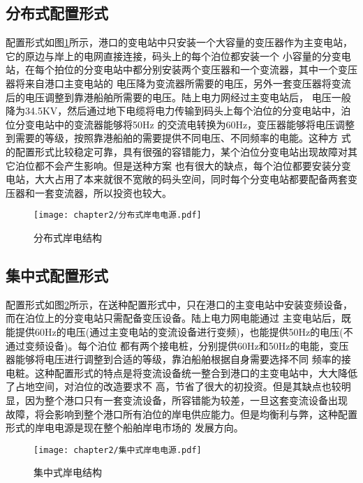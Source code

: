 \subsection{分布式配置形式}

配置形式如图\ref{fig:分布式岸电结构}所示，港口的变电站中只安装一个大容量的变压器作为主变电站，它的原边与岸上的电网直接连接，码头上的每个泊位都安装一个
小容量的分变电站，在每个拍位的分变电站中都分别安装两个变压器和一个变流器，其中一个变压器将来自港口主变电站的
电压降为变流器所需要的电压，另外一套变压器将变流后的电压调整到靠港船舶所需要的电压。陆上电力网经过主变电站后，
电压一般降为34.5KV，然后通过地下电缆将电力传输到码头上每个泊位的分变电站中，泊位分变电站中的变流器能够将50Hz
的交流电转换为60Hz，变压器能够将电压调整到需要的等级，按照靠港船舶的需要提供不同电压、不同频率的电能。这种方
式的配置形式比较稳定可靠，具有很强的容错能力，某个泊位分变电站出现故障对其它泊位都不会产生影响。但是送种方案
也有很大的缺点，每个泊位都要安装分变电站，大大占用了本来就很不宽敞的码头空间，同时每个分变电站都要配备两套变
压器和一套变流器，所以投资也较大。

\begin{figure}[!htp]
	\centering
	\texttt{[image: chapter2/分布式岸电电源.pdf]}
	\caption{分布式岸电结构}
	\label{fig:分布式岸电结构}
\end{figure}

\subsection{集中式配置形式}

配置形式如图\ref{fig:集中式岸电结构}所示，在送种配置形式中，只在港口的主变电站中安装变频设备，而在泊位上的分变电站只需配备变压设备。陆上电力网电能通过
主变电站后，既能提供60Hz的电压(通过主变电站的变流设备进行变频)，也能提供50Hz的电压(不通过变频设备)。每个泊位
都有两个接电桩，分别提供60Hz和50Hz的电能，变压器能够将电压进行调整到合适的等级，靠泊船舶根据自身需要选择不同
频率的接电粧。这种配置形式的特点是将变流设备统一整合到港口的主变电站中，大大降低了占地空间，对泊位的改造要求不
高，节省了很大的初投资。但是其缺点也较明显，因为整个港口只有一套变流设备，所容错能为较差，一旦这套变流设备出现
故障，将会影响到整个港口所有泊位的岸电供应能力。但是均衡利与弊，这种配置形式的岸电电源是现在整个船舶岸电市场的
发展方向。

\begin{figure}[!htp]
	\centering
	\texttt{[image: chapter2/集中式岸电电源.pdf]}
	\caption{集中式岸电结构}
	\label{fig:集中式岸电结构}
\end{figure}

